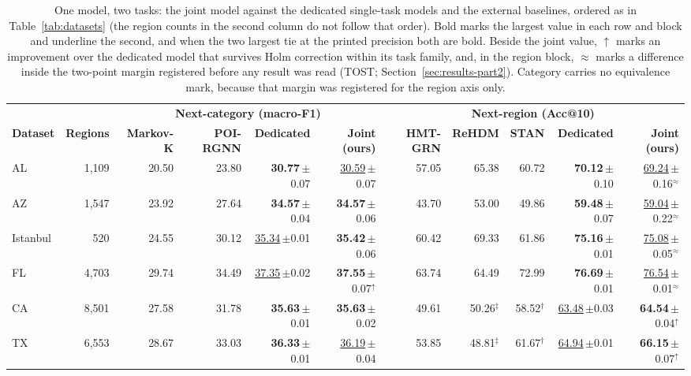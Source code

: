 \providecommand{\sd}[1]{\,{\scriptsize$\pm$#1}}
\begin{table}[!t]
\caption{One model, two tasks: the joint model against the dedicated single-task models and the
external baselines, ordered as in Table~\ref{tab:datasets} (the region counts in the second column
do not follow that order). Bold marks the largest value in each row and block and underline the
second, and when the two largest tie at the printed precision both are bold. Beside the joint value,
$\uparrow$ marks an improvement over the dedicated model that survives Holm correction within its
task family, and, in the region block, $\approx$ marks a difference inside the two-point margin
registered before any result was read (TOST; Section~\ref{sec:results-part2}). Category carries no
equivalence mark, because that margin was registered for the region axis only.}
\label{tab:results}
\centering
\begin{tabular}{l r | r r r r | r r r r r}
\hline
& & \multicolumn{4}{c|}{\textbf{Next-category (macro-F1)}} & \multicolumn{5}{c}{\textbf{Next-region (Acc@10)}} \\
\textbf{Dataset} & \textbf{Regions} & \textbf{Markov-K} & \textbf{POI-RGNN} & \textbf{Dedicated} & \textbf{Joint (ours)} & \textbf{HMT-GRN} & \textbf{ReHDM} & \textbf{STAN} & \textbf{Dedicated} & \textbf{Joint (ours)} \\
\hline
AL       & 1{,}109 & 20.50 & 23.80 & \textbf{30.77}\sd{0.07} & \underline{30.59}\sd{0.07} & 57.05 & 65.38 & 60.72 & \textbf{70.12}\sd{0.10} & \underline{69.24}\sd{0.16}$^{\approx}$ \\
AZ       & 1{,}547 & 23.92 & 27.64 & \textbf{34.57}\sd{0.04} & \textbf{34.57}\sd{0.06} & 43.70 & 53.00 & 49.86 & \textbf{59.48}\sd{0.07} & \underline{59.04}\sd{0.22}$^{\approx}$ \\
Istanbul & 520     & 24.55 & 30.12 & \underline{35.34}\sd{0.01} & \textbf{35.42}\sd{0.06} & 60.42 & 69.33 & 61.86 & \textbf{75.16}\sd{0.01} & \underline{75.08}\sd{0.05}$^{\approx}$ \\
FL       & 4{,}703 & 29.74 & 34.49 & \underline{37.35}\sd{0.02} & \textbf{37.55}\sd{0.07}$^{\uparrow}$ & 63.74 & 64.49 & 72.99 & \textbf{76.69}\sd{0.01} & \underline{76.54}\sd{0.01}$^{\approx}$ \\
CA       & 8{,}501 & 27.58 & 31.78 & \textbf{35.63}\sd{0.01} & \textbf{35.63}\sd{0.02} & 49.61 & 50.26$^{\ddagger}$ & 58.52$^{\dagger}$ & \underline{63.48}\sd{0.03} & \textbf{64.54}\sd{0.04}$^{\uparrow}$ \\
TX       & 6{,}553 & 28.67 & 33.03 & \textbf{36.33}\sd{0.01} & \underline{36.19}\sd{0.04} & 53.85 & 48.81$^{\ddagger}$ & 61.67$^{\dagger}$ & \underline{64.94}\sd{0.01} & \textbf{66.15}\sd{0.07}$^{\uparrow}$ \\

\end{tabular}
\end{table}

